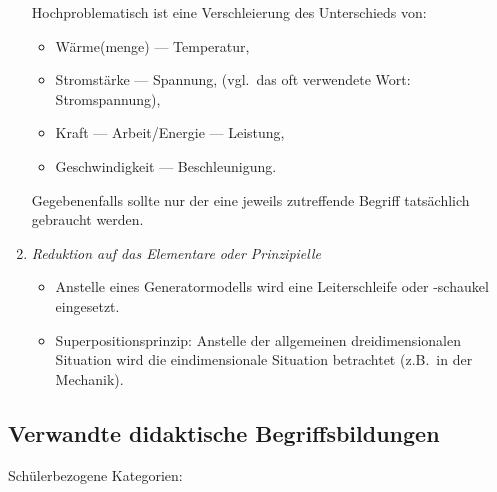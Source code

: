 \begin{enumerate}
Hochproblematisch ist eine Verschleierung des Unterschieds von:
\begin{itemize}
\item W\"{a}rme(menge) --- Temperatur,
\item Stromst\"{a}rke --- Spannung,
(vgl.\ das oft verwendete Wort: Stromspannung),
\item Kraft --- Arbeit/Energie --- Leistung,
\item Geschwindigkeit --- Beschleunigung.
\end{itemize}

Gegebenenfalls sollte nur der eine jeweils zutreffende Begriff tats\"{a}chlich gebraucht werden.

\item {\it Reduktion auf das Elementare oder Prinzipielle}
\begin{itemize}
\item Anstelle eines Generatormodells wird eine Leiterschleife oder
-schaukel eingesetzt.
\item Superpositionsprinzip: Anstelle der allgemeinen
dreidimensionalen Situation wird die eindimensionale
Situation betrachtet (z.B.\ in der Mechanik).
\end{itemize}
\end{enumerate}

\subsection{Verwandte didaktische Begriffsbildungen}

Sch\"{u}lerbezogene Kategorien:

